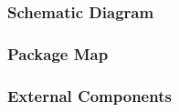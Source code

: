 \documentclass{article}
\begin{document}
    \subsubsection{Schematic Diagram}

    \subsubsection{Package Map}


    \subsubsection{External Components}
\end{document}
